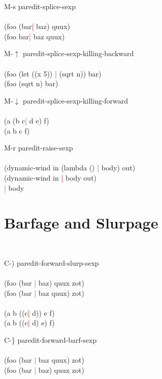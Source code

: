 \documentclass[8pt,a4paper,landscape]{extarticle}
\newcommand{\csr}{\textcolor{red}{| }}
\begin{document}
\begin{multicols}{4}
\begin{eqlist}
\item[M-s] paredit-splice-sexp\\
  \\
  (foo (bar\csr  baz) quux)\\
  (foo bar\csr  baz quux)\\


\item[M-$\uparrow$] paredit-splice-sexp-killing-backward\\
  \\
  (foo (let ((x 5)) \csr (sqrt n)) bar)\\
  (foo (sqrt n) bar)\\


\item[M-$\downarrow$] paredit-splice-sexp-killing-forward\\
  \\
  (a (b c\csr  d e) f)\\
  (a b c f)\\


\item[M-r] paredit-raise-sexp\\
  \\
  (dynamic-wind in (lambda () \csr body) out)\\
  (dynamic-wind in \csr body out)\\
  \csr body\\
\end{eqlist}

\section{Barfage and Slurpage}
\begin{eqlist}
  \tt
\item[C-)] paredit-forward-slurp-sexp\\
  \\
  (foo (bar \csr baz) quux zot)\\
  (foo (bar \csr baz quux) zot)\\
  \\
  (a b ((c\csr  d)) e f)\\
  (a b ((c\csr  d) e) f)\\


\item[C-\}] paredit-forward-barf-sexp\\
  \\
  (foo (bar \csr baz quux) zot)\\
  (foo (bar \csr baz) quux zot)\\



\end{eqlist}
\end{multicols}
\end{document}
